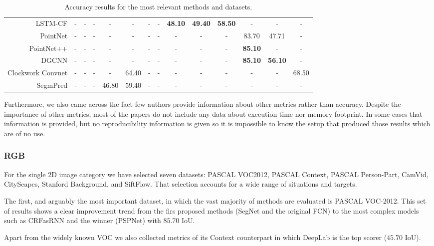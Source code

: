 \begin{table}[!htb]
{\begin{tabular}{|r|c|c|c|c|c|c|c|||c|c|c|||c|c|||c|}
    \acs{LSTM-CF}\cite{Li2016b} & - & - & - & - & - & - & - & \textbf{48.10} & \textbf{49.40} & \textbf{58.50} & - & - & - \\
    PointNet\cite{Qi2016} & - & - & - & - & - & - & - & - & - & - & 83.70 & 47.71 & -\\
    PointNet++\cite{Qi2017} & - & - & - & - & - & - & - & - & - & - & \textbf{85.10} & - & -\\
    \ac{DGCNN}\cite{Wang2018} & - & - & - & - & - & - & - & - & - & - & \textbf{85.10} & \textbf{56.10} & -\\
    Clockwork Convnet\cite{Shelhamer2016} & - & - & - & - & 64.40 & - & - & - & - & - & - & - & 68.50 \\
    SegmPred \cite{Luc2017} & - & - & - & 46.80 & 59.40 & - & - & - & - & - & - & - & - \\
    \hline
  \end{tabular}}
  \caption{Accuracy results for the most relevant methods and datasets.}
  \label{table:semseg:results}
\end{table}

Furthermore, we also came across the fact few authors provide information about other metrics rather than accuracy. Despite the importance of other metrics, most of the papers do not include any data about execution time nor memory footprint. In some cases that information is provided, but no reproducibility information is given so it is impossible to know the setup that produced those results which are of no use.

\subsubsection{\acs{RGB}}

For the single \acs{2D} image category we have selected seven datasets: PASCAL \acs{VOC}2012, PASCAL Context, PASCAL Person-Part, CamVid, CityScapes, Stanford Background, and SiftFlow. That selection accounts for a wide range of situations and targets.

The first, and arguably the most important dataset, in which the vast majority of methods are evaluated is PASCAL \acs{VOC}-2012. This set of results shows a clear improvement trend from the firs proposed methods (SegNet and the original \acs{FCN}) to the most complex models such as \acs{CRF}as\acs{RNN} and the winner (\acs{PSPNet}) with $85.70$ \acs{IoU}.

Apart from the widely known \acs{VOC} we also collected metrics of its Context counterpart in which DeepLab is the top scorer ($45.70$ \acs{IoU}).

